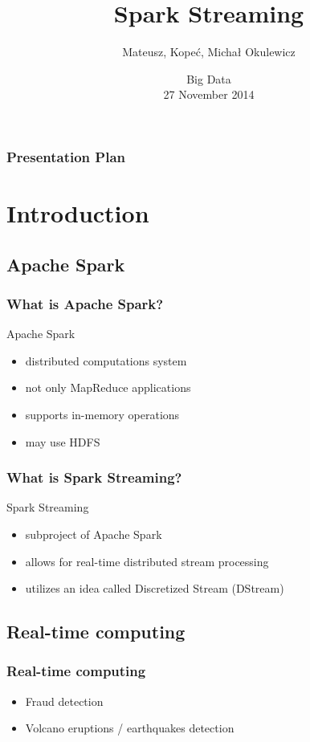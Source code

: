 \documentclass{beamer}
\title[Spark Streaming] %
{Spark Streaming}
\author %
{Mateusz, Kope{\'c}, Micha{\l} Okulewicz}
\institute %
{
Institute of Computer Science\\
Polish Academy of Sciences}
\date %
{Big Data \\27 November 2014}
\begin{document}
\begin{frame}
  \titlepage
\end{frame}

\begin{frame}
  \frametitle{Presentation Plan}
  \tableofcontents
\end{frame}

\section{Introduction}

\subsection*{Apache Spark\texttrademark}
\begin{frame}
\frametitle{What is Apache Spark\texttrademark?}

\begin{block}{Apache Spark\texttrademark}
\begin{itemize}
	\item distributed computations system
	\item not only MapReduce applications
	\item supports in-memory operations
	\item may use HDFS
\end{itemize}

\end{block}

\end{frame}

\begin{frame}
\frametitle{What is Spark Streaming?}

\begin{block}{Spark Streaming}
\begin{itemize}
	\item subproject of Apache Spark\texttrademark
	\item allows for real-time distributed stream processing
	\item utilizes an idea called Discretized Stream (DStream)
\end{itemize}

\end{block}

\end{frame}


\subsection*{Real-time computing}
\begin{frame}
\frametitle{Real-time computing}
	\begin{itemize}
		\item Fraud detection
		\item Volcano eruptions / earthquakes detection
	\end{itemize}
\end{frame}
\end{document}
